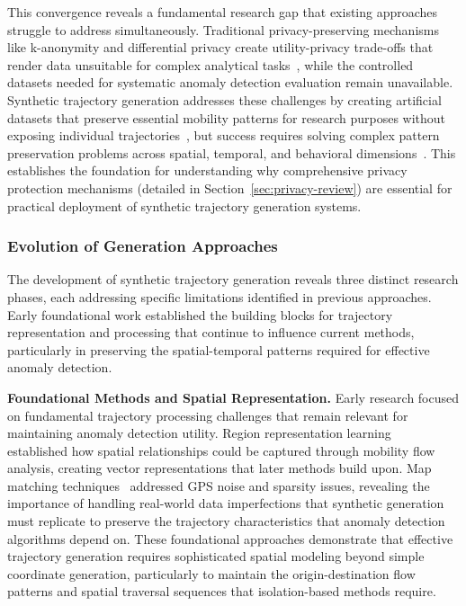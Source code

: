 \documentclass[runningheads]{llncs}
\begin{document}
This convergence reveals a fundamental research gap that existing approaches struggle to address simultaneously. Traditional privacy-preserving mechanisms like k-anonymity and differential privacy create utility-privacy trade-offs that render data unsuitable for complex analytical tasks~\cite{jordon2019pate}, while the controlled datasets needed for systematic anomaly detection evaluation remain unavailable. Synthetic trajectory generation addresses these challenges by creating artificial datasets that preserve essential mobility patterns for research purposes without exposing individual trajectories~\cite{cao2021generating}, but success requires solving complex pattern preservation problems across spatial, temporal, and behavioral dimensions~\cite{kong2023mobility,merhi2024synthetic}. This establishes the foundation for understanding why comprehensive privacy protection mechanisms (detailed in Section~\ref{sec:privacy-review}) are essential for practical deployment of synthetic trajectory generation systems.

\subsubsection{Evolution of Generation Approaches}

The development of synthetic trajectory generation reveals three distinct research phases, each addressing specific limitations identified in previous approaches. Early foundational work established the building blocks for trajectory representation and processing that continue to influence current methods, particularly in preserving the spatial-temporal patterns required for effective anomaly detection.

\textbf{Foundational Methods and Spatial Representation.} Early research focused on fundamental trajectory processing challenges that remain relevant for maintaining anomaly detection utility. Region representation learning~\cite{wang2017region} established how spatial relationships could be captured through mobility flow analysis, creating vector representations that later methods build upon. Map matching techniques~\cite{newson2009hidden} addressed GPS noise and sparsity issues, revealing the importance of handling real-world data imperfections that synthetic generation must replicate to preserve the trajectory characteristics that anomaly detection algorithms depend on. These foundational approaches demonstrate that effective trajectory generation requires sophisticated spatial modeling beyond simple coordinate generation, particularly to maintain the origin-destination flow patterns and spatial traversal sequences that isolation-based methods require.
\end{document}

